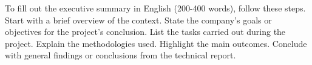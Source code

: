 


To fill out the executive summary in English (200-400 words), follow these steps. Start with a brief overview of the context. State the company's goals or objectives for the project's conclusion. List the tasks carried out during the project. Explain the methodologies used. Highlight the main outcomes. Conclude with general findings or conclusions from the technical report.

\newpage